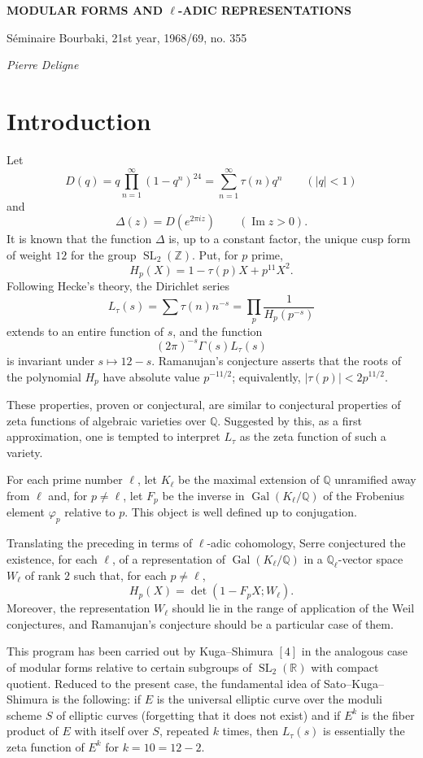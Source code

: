 \documentclass[10pt]{article}
\newcommand{\Q}{\mathbb Q}
\newcommand{\R}{\mathbb R}
\newcommand{\Z}{\mathbb Z}
\newcommand{\SL}{\operatorname{SL}}
\newcommand{\Gal}{\operatorname{Gal}}
\begin{document}
\begin{center}
{\Large\bfseries MODULAR FORMS AND $\ell$-ADIC REPRESENTATIONS}\par
\vspace{0.35em}
{\large Séminaire Bourbaki, 21st year, 1968/69, no. 355}\par
\vspace{0.7em}
{\itshape Pierre Deligne}
\end{center}

\section{Introduction}

Let
\[
D(q)=q\prod_{n=1}^{\infty}(1-q^n)^{24}
     =\sum_{n=1}^{\infty}\tau(n)q^n
\qquad (|q|<1)
\]
and
\[
\Delta(z)=D(e^{2\pi iz})\qquad (\operatorname{Im} z>0).
\]
It is known that the function $\Delta$ is, up to a constant factor, the unique cusp form of
weight $12$ for the group $\SL_2(\Z)$. Put, for $p$ prime,
\[
H_p(X)=1-\tau(p)X+p^{11}X^2 .
\]
Following Hecke's theory, the Dirichlet series
\[
L_\tau(s)=\sum \tau(n)n^{-s}=\prod_p\frac{1}{H_p(p^{-s})}
\]
extends to an entire function of $s$, and the function
\[
(2\pi)^{-s}\Gamma(s)L_\tau(s)
\]
is invariant under $s\mapsto 12-s$. Ramanujan's conjecture asserts that the roots of
the polynomial $H_p$ have absolute value $p^{-11/2}$; equivalently,
$|\tau(p)|<2p^{11/2}$.

These properties, proven or conjectural, are similar to conjectural properties of zeta
functions of algebraic varieties over $\Q$. Suggested by this, as a first approximation,
one is tempted to interpret $L_\tau$ as the zeta function of such a variety.

For each prime number $\ell$, let $K_\ell$ be the maximal extension of $\Q$ unramified
away from $\ell$ and, for $p\ne\ell$, let $F_p$ be the inverse in $\Gal(K_\ell/\Q)$ of
the Frobenius element $\varphi_p$ relative to $p$. This object is well defined up to
conjugation.

Translating the preceding in terms of $\ell$-adic cohomology, Serre conjectured the
existence, for each $\ell$, of a representation of $\Gal(K_\ell/\Q)$ in a $\Q_\ell$-vector
space $W_\ell$ of rank $2$ such that, for each $p\ne \ell$,
\[
H_p(X)=\det(1-F_pX;W_\ell).
\]
Moreover, the representation $W_\ell$ should lie in the range of application of the Weil
conjectures, and Ramanujan's conjecture should be a particular case of them.

This program has been carried out by Kuga--Shimura \([4]\) in the analogous case of
modular forms relative to certain subgroups of $\SL_2(\R)$ with compact quotient. Reduced
to the present case, the fundamental idea of Sato--Kuga--Shimura is the following: if
$E$ is the universal elliptic curve over the moduli scheme $S$ of elliptic curves (forgetting
that it does not exist) and if $E^k$ is the fiber product of $E$ with itself over $S$, repeated
$k$ times, then $L_\tau(s)$ is essentially the zeta function of $E^k$ for
$k=10=12-2$.
\end{document}
